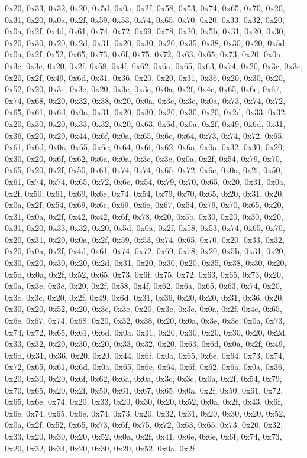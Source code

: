 \documentclass[
]{book}
\begin{document}
0x20, 0x33, 0x32, 0x20, 0x5d, 0x0a, 0x2f, 0x58, 0x53, 0x74, 0x65, 0x70, 0x20, 0x31, 0x20, 0x0a, 0x2f, 0x59, 0x53, 0x74, 0x65, 0x70, 0x20, 0x33, 0x32, 0x20, 0x0a, 0x2f, 0x4d, 0x61, 0x74, 0x72, 0x69, 0x78, 0x20, 0x5b, 0x31, 0x20, 0x30, 0x20, 0x30, 0x20, 0x2d, 0x31, 0x20, 0x30, 0x20, 0x35, 0x38, 0x30, 0x20, 0x5d, 0x0a, 0x2f, 0x52, 0x65, 0x73, 0x6f, 0x75, 0x72, 0x63, 0x65, 0x73, 0x20, 0x0a, 0x3c, 0x3c, 0x20, 0x2f, 0x58, 0x4f, 0x62, 0x6a, 0x65, 0x63, 0x74, 0x20, 0x3c, 0x3c, 0x20, 0x2f, 0x49, 0x6d, 0x31,
0x36, 0x20, 0x20, 0x31, 0x36, 0x20, 0x30, 0x20, 0x52, 0x20, 0x3e, 0x3e, 0x20, 0x3e, 0x3e, 0x0a, 0x2f, 0x4c, 0x65, 0x6e, 0x67, 0x74, 0x68, 0x20, 0x32, 0x38, 0x20, 0x0a, 0x3e, 0x3e, 0x0a, 0x73, 0x74, 0x72, 0x65, 0x61, 0x6d, 0x0a, 0x31, 0x20, 0x30, 0x20, 0x30, 0x20, 0x2d, 0x33, 0x32, 0x20, 0x30, 0x20, 0x33, 0x32, 0x20, 0x63, 0x6d, 0x0a, 0x2f, 0x49, 0x6d, 0x31, 0x36, 0x20, 0x20, 0x44, 0x6f, 0x0a, 0x65, 0x6e, 0x64, 0x73, 0x74, 0x72, 0x65, 0x61, 0x6d, 0x0a, 0x65, 0x6e, 0x64, 0x6f, 0x62, 0x6a, 0x0a, 0x32,
0x30, 0x20, 0x30, 0x20, 0x6f, 0x62, 0x6a, 0x0a, 0x3c, 0x3c, 0x0a, 0x2f, 0x54, 0x79, 0x70, 0x65, 0x20, 0x2f, 0x50, 0x61, 0x74, 0x74, 0x65, 0x72, 0x6e, 0x0a, 0x2f, 0x50, 0x61, 0x74, 0x74, 0x65, 0x72, 0x6e, 0x54, 0x79, 0x70, 0x65, 0x20, 0x31, 0x0a, 0x2f, 0x50, 0x61, 0x69, 0x6e, 0x74, 0x54, 0x79, 0x70, 0x65, 0x20, 0x31, 0x20, 0x0a, 0x2f, 0x54, 0x69, 0x6c, 0x69, 0x6e, 0x67, 0x54, 0x79, 0x70, 0x65, 0x20, 0x31, 0x0a, 0x2f, 0x42, 0x42, 0x6f, 0x78, 0x20, 0x5b, 0x30, 0x20, 0x30, 0x20, 0x31, 0x20, 0x33, 0x32,
0x20, 0x5d, 0x0a, 0x2f, 0x58, 0x53, 0x74, 0x65, 0x70, 0x20, 0x31, 0x20, 0x0a, 0x2f, 0x59, 0x53, 0x74, 0x65, 0x70, 0x20, 0x33, 0x32, 0x20, 0x0a, 0x2f, 0x4d, 0x61, 0x74, 0x72, 0x69, 0x78, 0x20, 0x5b, 0x31, 0x20, 0x30, 0x20, 0x30, 0x20, 0x2d, 0x31, 0x20, 0x30, 0x20, 0x35, 0x38, 0x30, 0x20, 0x5d, 0x0a, 0x2f, 0x52, 0x65, 0x73, 0x6f, 0x75, 0x72, 0x63, 0x65, 0x73, 0x20, 0x0a, 0x3c, 0x3c, 0x20, 0x2f, 0x58, 0x4f, 0x62, 0x6a, 0x65, 0x63, 0x74, 0x20, 0x3c, 0x3c, 0x20, 0x2f, 0x49, 0x6d, 0x31, 0x36, 0x20, 0x20,
0x31, 0x36, 0x20, 0x30, 0x20, 0x52, 0x20, 0x3e, 0x3e, 0x20, 0x3e, 0x3e, 0x0a, 0x2f, 0x4c, 0x65, 0x6e, 0x67, 0x74, 0x68, 0x20, 0x32, 0x38, 0x20, 0x0a, 0x3e, 0x3e, 0x0a, 0x73, 0x74, 0x72, 0x65, 0x61, 0x6d, 0x0a, 0x31, 0x20, 0x30, 0x20, 0x30, 0x20, 0x2d, 0x33, 0x32, 0x20, 0x30, 0x20, 0x33, 0x32, 0x20, 0x63, 0x6d, 0x0a, 0x2f, 0x49, 0x6d, 0x31, 0x36, 0x20, 0x20, 0x44, 0x6f, 0x0a, 0x65, 0x6e, 0x64, 0x73, 0x74, 0x72, 0x65, 0x61, 0x6d, 0x0a, 0x65, 0x6e, 0x64, 0x6f, 0x62, 0x6a, 0x0a, 0x36, 0x20, 0x30, 0x20,
0x6f, 0x62, 0x6a, 0x0a, 0x3c, 0x3c, 0x0a, 0x2f, 0x54, 0x79, 0x70, 0x65, 0x20, 0x2f, 0x50, 0x61, 0x67, 0x65, 0x0a, 0x2f, 0x50, 0x61, 0x72, 0x65, 0x6e, 0x74, 0x20, 0x33, 0x20, 0x30, 0x20, 0x52, 0x0a, 0x2f, 0x43, 0x6f, 0x6e, 0x74, 0x65, 0x6e, 0x74, 0x73, 0x20, 0x32, 0x31, 0x20, 0x30, 0x20, 0x52, 0x0a, 0x2f, 0x52, 0x65, 0x73, 0x6f, 0x75, 0x72, 0x63, 0x65, 0x73, 0x20, 0x32, 0x33, 0x20, 0x30, 0x20, 0x52, 0x0a, 0x2f, 0x41, 0x6e, 0x6e, 0x6f, 0x74, 0x73, 0x20, 0x32, 0x34, 0x20, 0x30, 0x20, 0x52, 0x0a, 0x2f,
\end{document}
